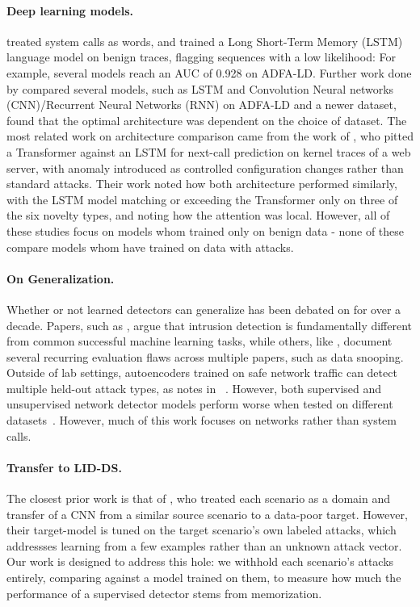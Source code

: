 \documentclass{article}
\begin{document}
\paragraph{Deep learning models.} \citet{kim2016lstm} treated system calls as words, and trained a Long Short-Term Memory (LSTM) language model on benign traces, flagging sequences with a low likelihood: For example, several models reach an AUC of 0.928 on ADFA-LD. Further work done by \citet{ring2021methods} compared several models, such as LSTM and Convolution Neural networks (CNN)/Recurrent Neural Networks (RNN) on ADFA-LD and a newer dataset, found that the optimal architecture was dependent on the choice of dataset. The most related work on architecture comparison came from the work of \citet{fournier2023language}, who pitted a Transformer against an LSTM for next-call prediction on kernel traces of a web server, with anomaly introduced as controlled configuration changes rather than standard attacks. Their work noted how both architecture performed similarly, with the LSTM model matching or exceeding the Transformer only on three of the six novelty types, and noting how the attention was local. However, all of these studies focus on models whom trained only on benign data - none of these compare models whom have trained on data with attacks.

\paragraph{On Generalization.} Whether or not learned detectors can generalize has been debated on for over a decade. Papers, such as \citet{sommer2010outside}, argue that intrusion detection is fundamentally different from common successful machine learning tasks, while others, like \citet{arp2022dos}, document several recurring evaluation flaws across multiple papers, such as data snooping. Outside of lab settings, autoencoders trained on safe network traffic can detect multiple held-out attack types, as notes in ~\citep{hindy2020zeroday}. However, both supervised and unsupervised network detector models perform worse when tested on different datasets~\citep{layeghy2022generalisability}. However, much of this work focuses on networks rather than system calls.

\paragraph{Transfer to LID-DS.} The closest prior work is that of \citet{ajayi2022crossdomain}, who treated each scenario as a domain and transfer of a CNN from a similar source scenario to a data-poor target. However, their target-model is tuned on the target scenario's own labeled attacks, which addressses learning from a few examples rather than an unknown attack vector. Our work is designed to address this hole: we withhold each scenario's attacks entirely, comparing against a model trained on them, to measure how much the performance of a supervised detector stems from memorization.
\end{document}

